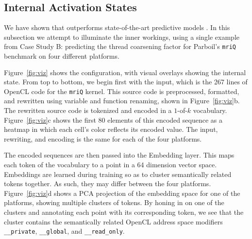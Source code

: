 


\subsection{\DeepTune Internal Activation States}



We have shown that \DeepTune {} outperforms state-of-the-art predictive models . In this subsection we attempt to illuminate the inner workings, using a single example from Case Study B: predicting the thread coarsening factor for Parboil's \texttt{mriQ} benchmark on four different platforms.

Figure~\ref{fig:viz} shows the \DeepTune configuration, with visual overlays showing the internal state. From top to bottom, we begin first with the input, which is the 267 lines of OpenCL code for the \texttt{mriQ} kernel. This source code is preprocessed, formatted, and rewritten using variable and function renaming, shown in Figure~\ref{fig:viz}b. The rewritten source code is tokenized and encoded in a $1$-of-$k$ vocabulary. Figure~\ref{fig:viz}c shows the first 80 elements of this encoded sequence as a heatmap in which each cell's color reflects its encoded value. The input, rewriting, and encoding is the same for each of the four platforms.


The encoded sequences are then passed into the Embedding layer. This maps each token of the vocabulary to a point in a 64 dimension vector space. Embeddings are learned during training so as to cluster semantically related tokens together. As such, they may differ between the four platforms. Figure~\ref{fig:viz}d shows a PCA projection of the embedding space for one of the platforms, showing multiple clusters of tokens. By honing in on one of the clusters and annotating each point with its corresponding token, we see that the cluster contains the semantically related OpenCL address space modifiers \texttt{\_\_private}, \texttt{\_\_global}, and \texttt{\_\_read\_only}.

